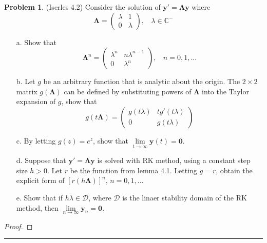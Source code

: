 \documentclass[a4paper, 10pt]{article}
\theoremstyle{definition}
\newtheorem{problem}{Problem}
\theoremstyle{hSol}
\begin{document}
\begin{problem} (Iserles 4.2) Consider the solution of $\bm{y}'=\bm{\Lambda} \bm{y}$ where 
$$
\bm{\Lambda} = \begin{pmatrix}
  \lambda & 1\\
  0 & \lambda
\end{pmatrix}, ~~~~\lambda \in \mathbb{C}^-
$$
\begin{itemize}
  \item[a.] Show that 
  $$
  \bm{\Lambda}^n = \begin{pmatrix}
    \lambda^n & n \lambda^{n-1} \\
    0 & \lambda^n
  \end{pmatrix},~~~~ n = 0,1,...
  $$
  \item[b.] Let $g$ be an arbitrary function that is analytic about the origin. The $2\times2$ matrix $g(\bm{\Lambda})$ can be defined by substituting powers of $\bm{\Lambda}$ into the Taylor expansion of $g$, show that
  $$
  g(t \bm{\Lambda}) = \begin{pmatrix}
    g(t \lambda) & tg'(t \lambda) \\
    0 & g(t \lambda)
  \end{pmatrix}
  $$
  \item[c.] By letting $g(z) = e^z$, show that $\lim\limits_{t\rightarrow\infty}\bm{y}(t)=\bm{0}$.
  \item[d.] Suppose that $\bm{y}'= \bm{\Lambda} \bm{y}$ is solved with RK method, using a constant step size $h>0$. Let $r$ be the function from lemma 4.1. Letting $g=r$, obtain the explicit form of $[r(h \bm{\Lambda})]^n$, $n=0,1,...$
  \item[e.] Show that if $h \lambda \in \mathcal{D}$, where $\mathcal{D}$ is the linaer stability domain of the RK method, then $\lim\limits_{n\rightarrow\infty} \bm{y}_n = \bm{0}$.
\end{itemize}
\end{problem}
\begin{proof} 
\end{proof} 
\noindent\rule{16cm}{0.4pt}
\end{document}
